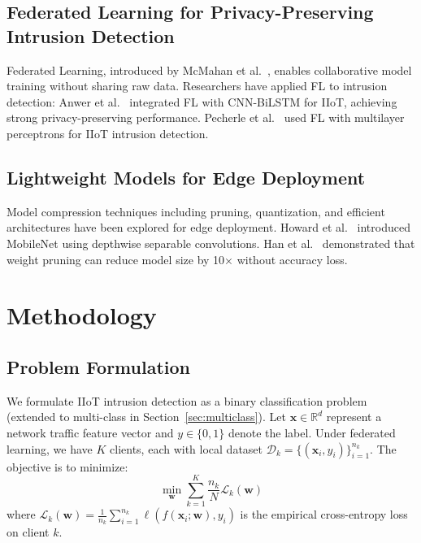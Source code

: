 \documentclass[preprint,12pt]{elsarticle}
\begin{document}
\subsection{Federated Learning for Privacy-Preserving Intrusion Detection}

Federated Learning, introduced by McMahan et al.~\cite{mcmahan2017communication}, enables collaborative model training without sharing raw data. Researchers have applied FL to intrusion detection: Anwer et al.~\cite{anwer2025advanced} integrated FL with CNN-BiLSTM for IIoT, achieving strong privacy-preserving performance. Pecherle et al.~\cite{pecherle2026federated} used FL with multilayer perceptrons for IIoT intrusion detection.

\subsection{Lightweight Models for Edge Deployment}

Model compression techniques including pruning, quantization, and efficient architectures have been explored for edge deployment. Howard et al.~\cite{howard2017mobilenets} introduced MobileNet using depthwise separable convolutions. Han et al.~\cite{han2016deep} demonstrated that weight pruning can reduce model size by 10$\times$ without accuracy loss.

\section{Methodology}
\label{sec:method}

\subsection{Problem Formulation}

We formulate IIoT intrusion detection as a binary classification problem (extended to multi-class in Section~\ref{sec:multiclass}). Let $\mathbf{x} \in \mathbb{R}^d$ represent a network traffic feature vector and $y \in \{0, 1\}$ denote the label. Under federated learning, we have $K$ clients, each with local dataset $\mathcal{D}_k = \{(\mathbf{x}_i, y_i)\}_{i=1}^{n_k}$. The objective is to minimize:
\begin{equation}
\min_{\mathbf{w}} \sum_{k=1}^{K} \frac{n_k}{N} \mathcal{L}_k(\mathbf{w})
\label{eq:fl_objective}
\end{equation}
where $\mathcal{L}_k(\mathbf{w}) = \frac{1}{n_k} \sum_{i=1}^{n_k} \ell(f(\mathbf{x}_i; \mathbf{w}), y_i)$ is the empirical cross-entropy loss on client $k$.
\end{document}

